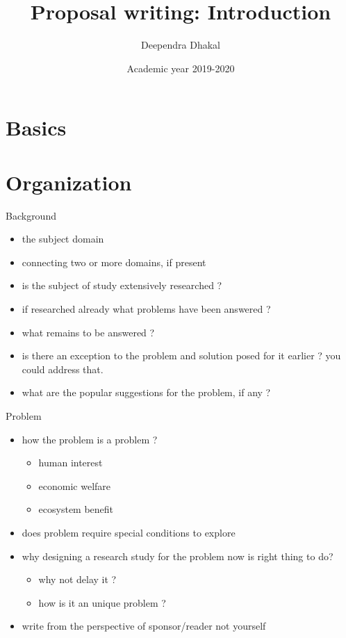 \documentclass[ignorenonframetext,aspectratio=169]{beamer}
\title{Proposal writing: Introduction}
\author{Deependra Dhakal}
\institute{GAASC, Baitadi \and Tribhuwan University}
\date{Academic year 2019-2020}
\providecommand{\tightlist}{%
  \setlength{\itemsep}{0pt}\setlength{\parskip}{0pt}}
\begin{document}
\frame{\titlepage}

\begin{frame}
\tableofcontents[hideallsubsections]
\end{frame}
\hypertarget{basics}{%
\section{Basics}\label{basics}}

\hypertarget{organization}{%
\section{Organization}\label{organization}}

\begin{frame}{Background}
\protect\hypertarget{background}{}

\begin{itemize}
\tightlist
\item
  the subject domain
\item
  connecting two or more domains, if present
\item
  is the subject of study extensively researched ?
\item
  if researched already what problems have been answered ?
\item
  what remains to be answered ?
\item
  is there an exception to the problem and solution posed for it earlier
  ? you could address that.
\item
  what are the popular suggestions for the problem, if any ?
\end{itemize}

\end{frame}

\begin{frame}{Problem}
\protect\hypertarget{problem}{}

\begin{itemize}
\tightlist
\item
  how the problem is a problem ?

  \begin{itemize}
  \tightlist
  \item
    human interest
  \item
    economic welfare
  \item
    ecosystem benefit
  \end{itemize}
\item
  does problem require special conditions to explore
\item
  why designing a research study for the problem now is right thing to
  do?

  \begin{itemize}
  \tightlist
  \item
    why not delay it ?
  \item
    how is it an unique problem ?
  \end{itemize}
\item
  write from the perspective of sponsor/reader not yourself
\end{itemize}

\end{frame}
\end{document}
